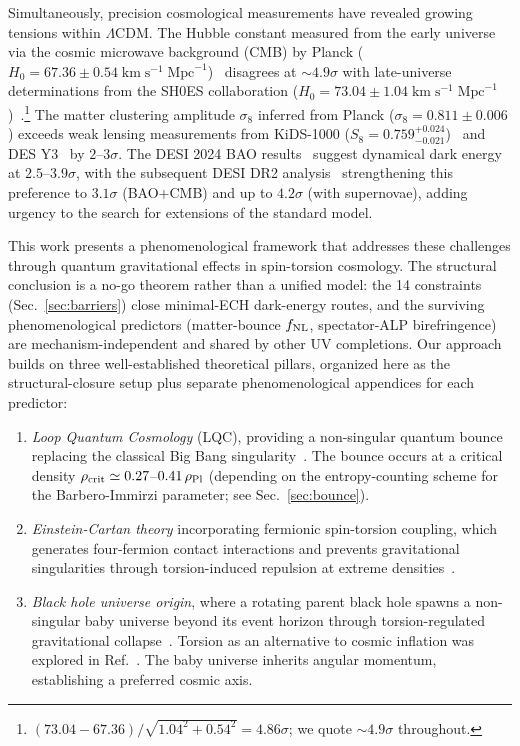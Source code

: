 \documentclass[aps,prd,twocolumn,superscriptaddress,showpacs,preprintnumbers,nofootinbib,longbibliography,floatfix]{revtex4-2}
\newcommand{\rhocrit}{\rho_{\rm crit}}
\newcommand{\rhoPl}{\rho_{\rm Pl}}
\begin{document}
Simultaneously, precision cosmological measurements have revealed growing tensions within $\Lambda$CDM. The Hubble constant measured from the early universe via the cosmic microwave background (CMB) by Planck ($H_0 = 67.36 \pm 0.54\;\text{km}\;\text{s}^{-1}\;\text{Mpc}^{-1}$)~\cite{Planck2018params} disagrees at ${\sim}4.9\sigma$ with late-universe determinations from the SH0ES collaboration ($H_0 = 73.04 \pm 1.04\;\text{km}\;\text{s}^{-1}\;\text{Mpc}^{-1}$)~\cite{Riess2022}.\footnote{$(73.04 - 67.36)/\sqrt{1.04^2 + 0.54^2} = 4.86\sigma$; we quote ${\sim}4.9\sigma$ throughout.} The matter clustering amplitude $\sigma_8$ inferred from Planck ($\sigma_8 = 0.811 \pm 0.006$) exceeds weak lensing measurements from KiDS-1000 ($S_8 = 0.759^{+0.024}_{-0.021}$)~\cite{KiDS2021} and DES Y3~\cite{DES2024} by $2$--$3\sigma$. The DESI 2024 BAO results~\cite{DESI2024} suggest dynamical dark energy at $2.5$--$3.9\sigma$, with the subsequent DESI DR2 analysis~\cite{DESI2025DR2} strengthening this preference to $3.1\sigma$ (BAO+CMB) and up to $4.2\sigma$ (with supernovae), adding urgency to the search for extensions of the standard model.

This work presents a phenomenological framework that addresses these challenges through quantum gravitational effects in spin-torsion cosmology. The structural conclusion is a no-go theorem rather than a unified model: the 14 constraints (Sec.~\ref{sec:barriers}) close minimal-ECH dark-energy routes, and the surviving phenomenological predictors (matter-bounce $f_{\rm NL}$, spectator-ALP birefringence) are mechanism-independent and shared by other UV completions. Our approach builds on three well-established theoretical pillars, organized here as the structural-closure setup plus separate phenomenological appendices for each predictor:

\begin{enumerate}[leftmargin=*]
\item \textit{Loop Quantum Cosmology} (LQC), providing a non-singular quantum bounce replacing the classical Big Bang singularity~\cite{Ashtekar2011}. The bounce occurs at a critical density $\rhocrit \simeq 0.27$--$0.41\,\rhoPl$ (depending on the entropy-counting scheme for the Barbero-Immirzi parameter; see Sec.~\ref{sec:bounce}).

\item \textit{Einstein-Cartan theory} incorporating fermionic spin-torsion coupling, which generates four-fermion contact interactions and prevents gravitational singularities through torsion-induced repulsion at extreme densities~\cite{Hehl1976,Poplawski2012}.

\item \textit{Black hole universe origin}, where a rotating parent black hole spawns a non-singular baby universe beyond its event horizon through torsion-regulated gravitational collapse~\cite{Poplawski2016}. Torsion as an alternative to cosmic inflation was explored in Ref.~\cite{Poplawski2010}. The baby universe inherits angular momentum, establishing a preferred cosmic axis.
\end{enumerate}
\end{document}
